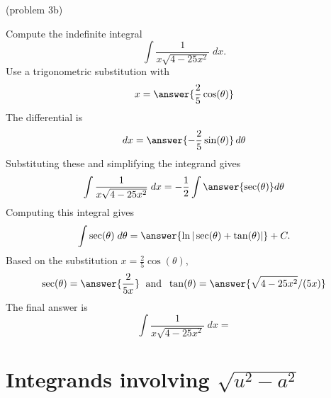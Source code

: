 \documentclass[handout]{ximera}
\begin{document}
\begin{problem}(problem 3b)

Compute the indefinite integral
\[
\int \frac{1}{x\sqrt{4-25x^2}}  \; dx.
\]
Use a trigonometric substitution with\\
\[
x = \answer{\frac25\cos(\theta)}
\]
The differential is\\
\[
dx = \answer{-\frac25\sin(\theta)}\,d\theta
\]
Substituting these and simplifying the integrand gives\\
\[
\int \frac{1}{x\sqrt{4-25x^2}}  \; dx = -\frac12\int \answer{\sec(\theta)} d\theta
\]
Computing this integral gives
\[
\int \sec(\theta) \; d\theta = \answer{\ln|\sec(\theta) + \tan(\theta)|} + C.
\]
Based on the substitution $x = \frac25 \cos(\theta)$, \\
\[
\sec(\theta) = \answer{\frac{2}{5x}} \; \text{ and } \; \tan(\theta) = \answer{\sqrt{4-25x^2}/(5x)}
\]
The final answer is
\[
\int  \frac{1}{x\sqrt{4-25x^2}} \; dx = 
\]
\begin{center}
\begin{multipleChoice}
\end{multipleChoice}
\end{center}


\end{problem}

















\section{Integrands involving $\sqrt{u^2 - a^2}$}
\end{document}
